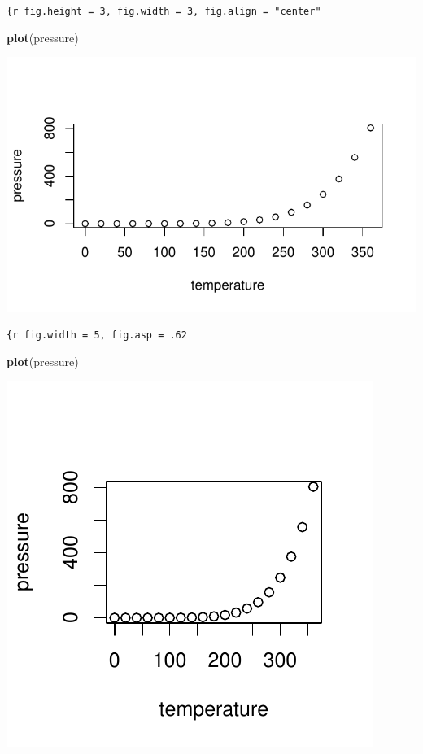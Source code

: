 \documentclass[
]{book}
\newenvironment{Shaded}{\begin{snugshade}}{\end{snugshade}}
\newcommand{\FunctionTok}[1]{\textcolor[rgb]{0.13,0.29,0.53}{\textbf{#1}}}
\newcommand{\NormalTok}[1]{#1}
\theoremstyle{definition}
\theoremstyle{definition}
\theoremstyle{definition}
\theoremstyle{definition}
\theoremstyle{remark}
\begin{document}
\texttt{\{r\ fig.height\ =\ 3,\ fig.width\ =\ 3,\ fig.align\ =\ "center"}

\begin{Shaded}
\begin{Highlighting}[]
\FunctionTok{plot}\NormalTok{(pressure)}
\end{Highlighting}
\end{Shaded}

\includegraphics{202401280001-test_files/figure-latex/unnamed-chunk-8-1.pdf}

\texttt{\{r\ fig.width\ =\ 5,\ fig.asp\ =\ .62}

\begin{Shaded}
\begin{Highlighting}[]
\FunctionTok{plot}\NormalTok{(pressure)}
\end{Highlighting}
\end{Shaded}

\begin{center}\includegraphics{202401280001-test_files/figure-latex/unnamed-chunk-9-1} \end{center}
\end{document}
